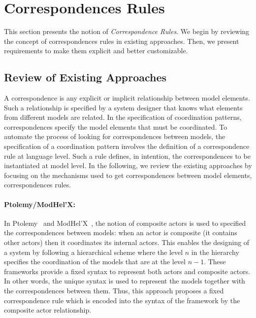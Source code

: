 \section{Correspondences Rules}


This section presents the notion of \emph{Correspondence Rules}. We begin by reviewing the concept of correspondences rules in existing approaches. Then, we present requirements to make them explicit and better customizable.  

\subsection{Review of Existing Approaches}
A correspondence is any explicit or implicit relationship between model elements. Such a relationship is specified by a system designer that knows what elements from different models are related. In the specification of coordination patterns, correspondences specify the model elements that must be coordinated. To automate the process of looking for correspondences between models, the specification of a coordination pattern involves the definition of a correspondence rule at language level. Such a rule defines, in intention, the correspondences to be instantiated at model level. In the following, we review the existing approaches by focusing on the mechanisms used to get correspondences between model elements, \ie correspondences rules.       

\paragraph{Ptolemy/ModHel'X: }
In Ptolemy~\cite{ptoleframebib} and ModHel'X~\cite{modhelxbib}, the notion of composite actors is used to specified the correspondences between models: when an actor is composite (\ie it contains other actors) then it coordinates its internal actors. This enables the designing of a system by following a hierarchical scheme where the level $n$ in the hierarchy specifies the coordination of the models that are at the level $n-1$. These frameworks provide a fixed syntax to represent both actors and composite actors. In other words, the unique syntax is used to represent the models together with the correspondences between them. Thus, this approach proposes a fixed correspondence rule which is encoded into the syntax of the framework by the composite actor relationship.  


